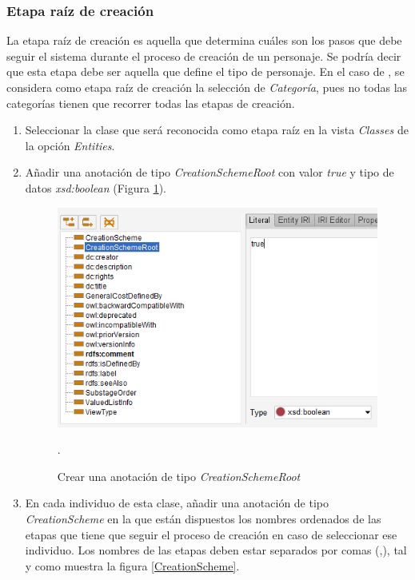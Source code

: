 \subsubsection{Etapa raíz de creación}
La etapa raíz de creación es aquella que determina cuáles son los pasos que debe seguir el sistema durante el proceso 
de creación de un personaje. Se podría decir que esta etapa debe ser aquella que define el tipo de personaje. En el 
caso de \anima, se considera como etapa raíz de creación la selección de \textit{Categoría}, pues no todas las categorías 
tienen que recorrer todas las etapas de creación. \medskip

\begin{enumerate}
    \item Seleccionar la clase que será reconocida como etapa raíz en la vista \textit{Classes} de la opción \textit{Entities}.
    \item Añadir una anotación de tipo \textit{CreationSchemeRoot} con valor \textit{true} y tipo de datos 
    \textit{xsd:boolean} (Figura \ref*{CreationSchemeRoot}).
    \begin{figure}[H]
        \centering
        \includegraphics[scale=0.5]{Figures/Protege/CreationSchemeRoot.png}
        \caption{Crear una anotación de tipo \textit{CreationSchemeRoot}}.
        \label{CreationSchemeRoot}
    \end{figure}

    \item En cada individuo de esta clase, añadir una anotación de tipo \textit{CreationScheme} en la que 
    están dispuestos los nombres ordenados de las etapas que tiene que seguir el proceso de creación en caso de 
    seleccionar ese individuo. Los nombres de las etapas deben estar separados por comas (,), tal y como muestra 
    la figura \ref*{CreationScheme}.


\end{enumerate}
